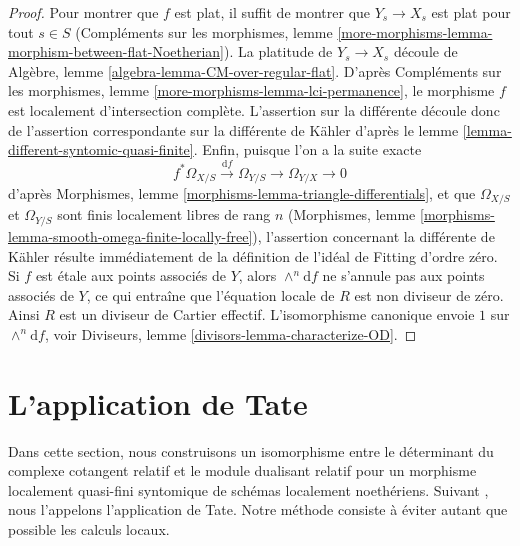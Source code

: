 \begin{proof}
Pour montrer que $f$ est plat, il suffit de montrer que $Y_s \to X_s$
est plat pour tout $s \in S$ (Compléments sur les morphismes, lemme
\ref{more-morphisms-lemma-morphism-between-flat-Noetherian}).
La platitude de $Y_s \to X_s$ découle de
Algèbre, lemme \ref{algebra-lemma-CM-over-regular-flat}.
D'après Compléments sur les morphismes, lemme
\ref{more-morphisms-lemma-lci-permanence},
le morphisme $f$ est localement d'intersection complète.
L'assertion sur la différente découle donc de
l'assertion correspondante sur la différente de Kähler d'après le
lemme \ref{lemma-different-syntomic-quasi-finite}.
Enfin, puisque l'on a la suite exacte
$$
f^*\Omega_{X/S} \xrightarrow{\text{d}f} \Omega_{Y/S} \to \Omega_{Y/X} \to 0
$$
d'après Morphismes, lemme \ref{morphisms-lemma-triangle-differentials},
et que $\Omega_{X/S}$ et $\Omega_{Y/S}$ sont finis localement libres
de rang $n$ (Morphismes, lemme
\ref{morphisms-lemma-smooth-omega-finite-locally-free}),
l'assertion concernant la différente de Kähler résulte immédiatement de la définition
de l'idéal de Fitting d'ordre zéro. Si $f$ est étale aux points associés
de $Y$, alors $\wedge^n\text{d}f$ ne s'annule pas aux
points associés de $Y$, ce qui entraîne que l'équation locale
de $R$ est non diviseur de zéro. Ainsi $R$ est un diviseur de Cartier effectif.
L'isomorphisme canonique envoie $1$ sur $\wedge^n\text{d}f$, voir
Diviseurs, lemme \ref{divisors-lemma-characterize-OD}.
\end{proof}






\section{L'application de Tate}
\label{section-tate-map}

\noindent
Dans cette section, nous construisons un isomorphisme entre
le déterminant du complexe cotangent relatif et
le module dualisant relatif pour un morphisme localement quasi-fini
syntomique de schémas localement noethériens. Suivant
\cite[1.4.4]{Garel}, nous l'appelons l'application de Tate.
Notre méthode consiste à éviter autant que possible
les calculs locaux.

